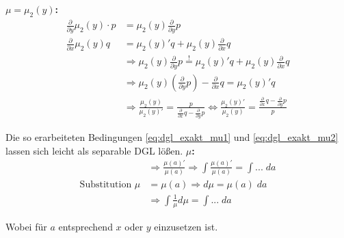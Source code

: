 	\textbf{$\mu = \mu_2 (y)$: } 
	\begin{align}
			\frac{\partial}{\partial y} \mu_2 (y) \cdot p &= \mu_2 (y) \frac{\partial}{\partial y} p \nonumber \\
			\frac{\partial}{\partial x} \mu_2 (y) q &= \mu_2 (y)' q + \mu_2 (y) \frac{\partial}{\partial x} q  \nonumber \\
			&\Rightarrow \mu_2(y) \frac{\partial}{\partial y} p \overset{!}{=} \mu_2 (y)' q + \mu_2 (y) \frac{\partial}{\partial x}q \nonumber \\
			&\Rightarrow \mu_2 (y) \left( \frac{\partial}{\partial y} p\right) - \frac{\partial}{\partial x} q = \mu_2 (y)' q \nonumber \\
			&\Rightarrow \frac{\mu_2 (y)}{\mu_2 (y)'} = \frac{p}{\frac{\partial}{\partial x}q - \frac{\partial}{\partial y}p} \Leftrightarrow \frac{\mu_2 (y)'}{\mu_2 (y)} = \frac{\frac{\partial}{\partial x} q - \frac{\partial}{\partial y} p}{p} \label{eq:dgl_exakt_mu2}
	\end{align}
	
	Die so erarbeiteten Bedingungen \eqref{eq:dgl_exakt_mu1} und \eqref{eq:dgl_exakt_mu2} lassen sich leicht als separable DGL lößen. \newline
	\textbf{$\mu$:}
	\begin{align}
		&\Rightarrow \frac{\mu (a)'}{\mu (a)} \Rightarrow \int \frac{\mu (a)'}{\mu (a)}  = \int ...  \;da \nonumber \\
		\text{Substitution } \mu &= \mu(a) \Rightarrow d\mu = \mu (a) \;da \nonumber \\
		&\Rightarrow \int \frac{1}{\mu} d\mu = \int ... \; da
	\end{align}
	
	Wobei für  $a$ entsprechend $x$ oder $y$ einzusetzen ist.